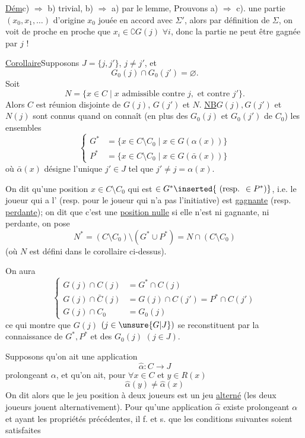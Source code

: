 \uline{Dém}\quad c) $\Longrightarrow$ b) trivial, b) $\Longrightarrow$ a) par le lemme, Prouvons a) $\Longrightarrow$ c).  une partie $(x_0,x_1,\ldots)$ d'origine $x_0$ jouée en accord avec $\Sigma'$, alors par définition de $\Sigma$, on voit de proche en proche que $x_i\in\complement G(j)$ $\forall i$, donc la partie ne peut être gagnée par $j$ !

\uline{Corollaire}\quad Supposons $J=\{j,j'\}$, $j\ne j'$, et
\margin{$\big|$}
\[
G_0(j)\cap G_0(j')=\varnothing.
\]
Soit 
\[
N=\{x\in C\mid x\text{ admissible contre }j,\text{ et contre }j'\}.
\]
\margin{$\big|$}
Alors $C$ est réunion disjointe de $G(j)$, $G(j')$ et $N$.
\uline{NB}\quad $G(j),G(j')$ et $N(j)$ sont connus quand on connaît (en plus des  $G_0(j)$ et $G_0(j')$ de $C_0$) les ensembles
\[
\left\{\begin{aligned}
G^*&=\{x\in C\setminus C_0\mid x\in G(\alpha(x))\}\\
P^*&=\{x\in C\setminus C_0\mid x\in G(\bar\alpha(x))\}
\end{aligned}\right.
\]
où $\bar\alpha(x)$ désigne l'unique $j'\in J$ tel que $j'\ne j=\alpha(x)$.

On dit qu'une position $x\in C\setminus C_0$ qui est $\in G^*\inserted{\text{ (resp. }\in P^*\text{)}}$, i.e.    le joueur qui a l' (resp. pour le joueur qui n'a pas l'initiative) est \uline{gagnante} (resp. \uline{perdante}); on dit que c'est une \uline{position nulle}  si elle n'est ni gagnante, ni perdante, on pose
\[
N^*=(C\setminus C_0)\setminus(G^*\cup P^*)=N\cap(C\setminus C_0)
\]
(où $N$ est défini dans le corollaire ci-dessus).

On aura
\[
\left\{\begin{aligned}
G(j)\cap C(j)&=G^*\cap C(j)\\
G(j)\cap\bar C(j)&=G(j)\cap C(j')=P^*\cap C(j')\\
G(j)\cap C_0&=G_0(j)
\end{aligned}\right.
\]
ce qui montre que  $G(j)$ $(j\in\unsure{G|J})$ se reconstituent par la connaissance de $G^*,P^*$ et des $G_0(j)$ $(j\in J)$.

Supposons qu'on ait une application
\[
\hat\alpha:C\longrightarrow J
\]
prolongeant $\alpha$, et qu'on ait, pour $\forall x\in C$ et $y\in R(x)$
\[
\hat\alpha(y)\ne\hat\alpha(x)
\]
On dit alors que le jeu  position à deux joueurs est un jeu \uline{alterné} (les deux joueurs jouent alternativement). Pour qu'une application $\hat\alpha$ existe prolongeant $\alpha$ et ayant les propriétés précédentes, il f. et s. que les  conditions suivantes soient satisfaites

